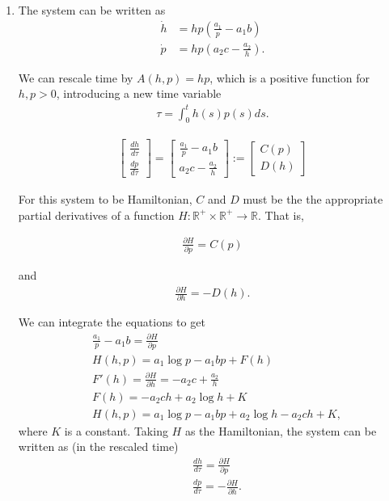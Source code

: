 \begin{solution}[8.7]
\begin{enumerate}
	\item The system can be written as
\begin{align}
    \dot{h} &= hp\left(\frac{a_1}{p}-a_1b\right) \\ 
    \dot{p} &= hp\left(a_2c-\frac{a_2}{h}\right).
\end{align}

We can rescale time by $A(h,p)=hp$, which is a positive function for $h,p>0$, introducing a new time variable 
\begin{align}
\tau = \int_0^t h(s)p(s)ds.
\end{align}

\begin{align}
    \begin{bmatrix}\frac{d h}{d\tau} \\
    \frac{d p}{d\tau}
    \end{bmatrix} = \begin{bmatrix} \frac{a_1}{p}-a_1b\\
    a_2c-\frac{a_2}{h}\end{bmatrix} := \begin{bmatrix}C(p) \\ D(h) \end{bmatrix}
\end{align}

For this system to be Hamiltonian, $C$ and $D$ must be the the appropriate partial derivatives of a function $H:\mathbb{R}^+ \times \mathbb{R}^+ \to \mathbb{R}$. That is,

\begin{align}
\frac{\partial H}{\partial p} = C(p)
\end{align}

and
\begin{align}
\frac{\partial H}{\partial h} = -D(h).
\end{align}

We can integrate the equations to get
\begin{align}
&\frac{a_1}{p}-a_1b = \frac{\partial H}{\partial p}\\
& H(h,p) = a_1\log p - a_1bp + F(h) \\
&  F'(h) = \frac{\partial H}{\partial h} = -a_2c + \frac{a_2}{h}\\
& F(h) = -a_2ch +a_2\log h + K \\
& H(h,p) = a_1\log p -a_1bp + a_2\log h -a_2ch +K,
\end{align}
where $K$ is a constant. Taking $H$ as the Hamiltonian, the system can be written as (in the rescaled time)
\begin{align}
    &\frac{d h}{ d\tau} = \frac{\partial H}{\partial p} \\
    &\frac{d p}{d\tau} = -\frac{\partial H}{\partial h}. 
\end{align}


\end{enumerate}
\end{solution}
